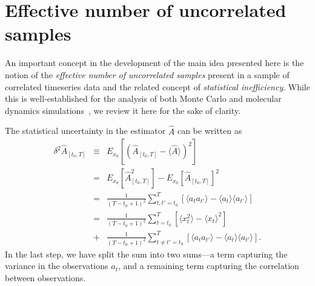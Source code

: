 \documentclass[aps,pre,twocolumn,nofootinbib,superscriptaddress,linenumbers,11point]{revtex4-1}
\newcommand{\expect}[1]{\langle #1 \rangle}                %
\newcommand{\estimator}[1]{\hat{#1}}                       %
\begin{document}
\section*{Effective number of uncorrelated samples}
\label{section:statistical-inefficiency}

An important concept in the development of the main idea presented here is the notion of the \emph{effective number of uncorrelated samples} present in a sample of correlated timeseries data and the related concept of \emph{statistical inefficiency}.
While this is well-established for the analysis of both Monte Carlo and molecular dynamics simulations~\cite{mueller-krumbhaar:j-stat-phys:1973:monte-carlo-analysis,swope:jcp:1982:autocorrelation-analysis,janke:2002:error-analysis,parallel-tempering-wham}, we review it here for the sake of clarity.

The statistical uncertainty in the estimator $\hat{A}$ can be written as
\begin{eqnarray}
\delta^2 \estimator{A}_{[t_0,T]} &\equiv& E_{x_0}\left[\left(\hat{A}_{[t_0,T]} - \expect{\estimator{A}}\right)^2\right] \nonumber \\
&=& E_{x_0}\left[ \hat{A}_{[t_0,T]} ^2 \right] - E_{x_0}\left[ \hat{A}_{[t_0,T]}  \right]^2 \nonumber \\
&=& \frac{1}{(T-t_0+1)^2} \sum_{t,t'=t_0}^T \left[ \expect{a_t a_{t'}} - \expect{a_t}\expect{a_{t'}} \right] \nonumber \\
&=& \frac{1}{(T-t_0+1)^2} \sum_{t=t_0}^T \left[ \expect{x_t^2} - \expect{x_t}^2 \right] \nonumber \\
\mbox{} &+& \frac{1}{(T-t_0+1)^2} \sum_{t\ne t' = t_0}^T \left[ \expect{a_t a_{t'}} - \expect{a_t}\expect{a_{t'}} \right] .
\end{eqnarray}
In the last step, we have split the sum into two sums---a term capturing the variance in the observations $a_t$, and a remaining term capturing the correlation between observations. 
\end{document}
